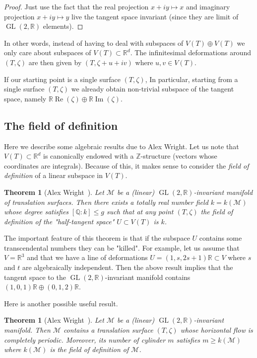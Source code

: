 \documentclass[a4paper,12pt]{article}
\def\bR{\mathbb{R}}
\def\bQ{\mathbb{Q}}
\def\bZ{\mathbb{Z}}
\def\cM{\mathcal{M}}
\def\Re{\operatorname{Re}}
\def\Im{\operatorname{Im}}
\def\GL{\operatorname{GL}}
\newtheorem{theorem}[definition]{Theorem}
\begin{document}
\begin{proof}
Just use the fact that the real projection $x+iy \mapsto x$ and imaginary projection
$x+iy \mapsto y$ live the tangent space invariant (since they are limit of $\GL(2,\bR)$
elements).
\end{proof}

In other words, instead of having to deal with subspaces of $V(T) \oplus V(T)$ we only
care about subspaces of $V(T) \subset \bR^d$. The infinitesimal deformations around $(T,\zeta)$ are
then given by $(T, \zeta + u + i v)$ where $u, v \in V(T)$.

If our starting point is a single surface $(T, \zeta)$, In particular, starting
from a single surface $(T, \zeta)$ we already obtain non-trivial subspace of the
tangent space, namely $\bR \Re(\zeta) \oplus \bR \Im(\zeta)$.

\subsection{The field of definition}
Here we describe some algebraic results due to Alex Wright. Let us note that
$V(T) \subset \bR^d$ is canonically endowed with a $\bZ$-structure (vectors
whose coordinates are integrals). Because of this, it makes sense to consider
the \textit{field of definition} of a linear subspace in $V(T)$.
\begin{theorem}[Alex Wright~\cite{Wright-field-of-def}]
Let $\cM$ be a (linear) $\GL(2,\bR)$-invariant manifold of translation surfaces.
Then there exists a totally real number field $k = k(\cM)$ whose degree satisfies
$[\bQ: k] \leq g$ such that at any point $(T,\zeta)$ the field of definition
of the "half-tangent space" $U \subset V(T)$ is $k$.
\end{theorem}
The important feature of this theorem is that if the subspace $U$ contains
some transcendental numbers they can be "killed". For example, let us assume
that $V = \bR^3$ and that we have a line of deformations $U = (1, s, 2s+1) \bR \subset V$
where $s$ and $t$ are algebraically independent. Then the above result 
implies that the tangent space to the $\GL(2,\bR)$-invariant manifold
contains $(1, 0, 1) \bR \oplus (0, 1, 2) \bR$.

Here is another possible useful result.
\begin{theorem}[Alex Wright~\cite{Wright-field-of-def}]
Let $\cM$ be a (linear) $\GL(2,\bR)$-invariant manifold. Then $\cM$ contains a
translation surface $(T,\zeta)$ whose horizontal flow is completely periodic.
Moreover, its number of cylinder $m$ satisfies $m \geq k(\cM)$ where $k(\cM)$
is the field of definition of $\cM$.
\end{theorem}
\end{document}
